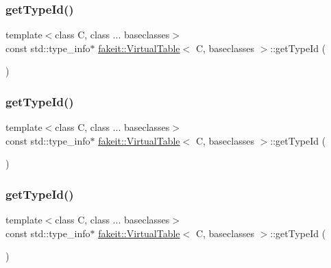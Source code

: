 \subsubsection{\texorpdfstring{getTypeId()}{getTypeId()}\hspace{0.1cm}{\footnotesize\ttfamily [1/9]}}
{\footnotesize\ttfamily template$<$class C, class ... baseclasses$>$ \\
const std\+::type\+\_\+info$\ast$ \mbox{\hyperlink{structfakeit_1_1VirtualTable}{fakeit\+::\+Virtual\+Table}}$<$ C, baseclasses $>$\+::get\+Type\+Id (\begin{DoxyParamCaption}{ }\end{DoxyParamCaption})\hspace{0.3cm}{\ttfamily [inline]}}

\mbox{\label{structfakeit_1_1VirtualTable_a5ed35b122d5d06afced80ab93062bfa3}} 
\subsubsection{\texorpdfstring{getTypeId()}{getTypeId()}\hspace{0.1cm}{\footnotesize\ttfamily [2/9]}}
{\footnotesize\ttfamily template$<$class C, class ... baseclasses$>$ \\
const std\+::type\+\_\+info$\ast$ \mbox{\hyperlink{structfakeit_1_1VirtualTable}{fakeit\+::\+Virtual\+Table}}$<$ C, baseclasses $>$\+::get\+Type\+Id (\begin{DoxyParamCaption}{ }\end{DoxyParamCaption})\hspace{0.3cm}{\ttfamily [inline]}}

\mbox{\label{structfakeit_1_1VirtualTable_a5ed35b122d5d06afced80ab93062bfa3}} 
\subsubsection{\texorpdfstring{getTypeId()}{getTypeId()}\hspace{0.1cm}{\footnotesize\ttfamily [3/9]}}
{\footnotesize\ttfamily template$<$class C, class ... baseclasses$>$ \\
const std\+::type\+\_\+info$\ast$ \mbox{\hyperlink{structfakeit_1_1VirtualTable}{fakeit\+::\+Virtual\+Table}}$<$ C, baseclasses $>$\+::get\+Type\+Id (\begin{DoxyParamCaption}{ }\end{DoxyParamCaption})\hspace{0.3cm}{\ttfamily [inline]}}

